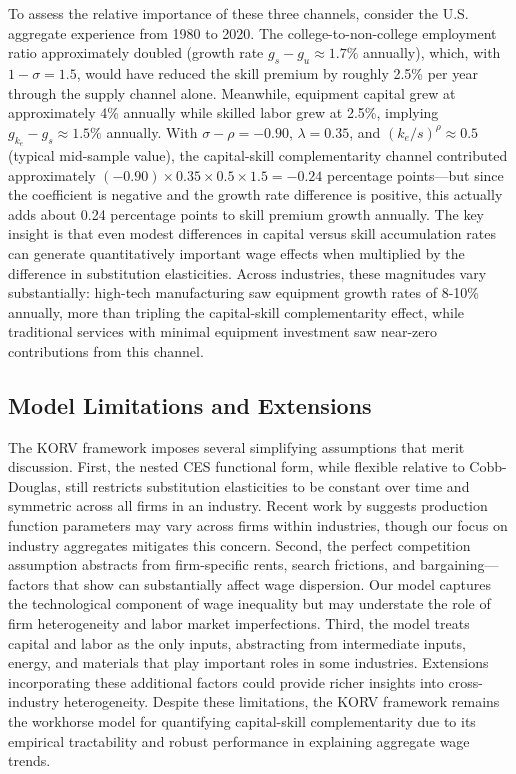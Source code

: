 \documentclass[12pt]{article}
\begin{document}
To assess the relative importance of these three channels, consider the U.S. aggregate experience from 1980 to 2020. The college-to-non-college employment ratio approximately doubled (growth rate $g_s - g_u \approx 1.7\%$ annually), which, with $1-\sigma = 1.5$, would have reduced the skill premium by roughly 2.5\% per year through the supply channel alone. Meanwhile, equipment capital grew at approximately 4\% annually while skilled labor grew at 2.5\%, implying $g_{k_e} - g_s \approx 1.5\%$ annually. With $\sigma - \rho = -0.90$, $\lambda = 0.35$, and $(k_e/s)^\rho \approx 0.5$ (typical mid-sample value), the capital-skill complementarity channel contributed approximately $(-0.90) \times 0.35 \times 0.5 \times 1.5 = -0.24$ percentage points---but since the coefficient is negative and the growth rate difference is positive, this actually adds about 0.24 percentage points to skill premium growth annually. The key insight is that even modest differences in capital versus skill accumulation rates can generate quantitatively important wage effects when multiplied by the difference in substitution elasticities. Across industries, these magnitudes vary substantially: high-tech manufacturing saw equipment growth rates of 8-10\% annually, more than tripling the capital-skill complementarity effect, while traditional services with minimal equipment investment saw near-zero contributions from this channel.

\subsection*{Model Limitations and Extensions}

The KORV framework imposes several simplifying assumptions that merit discussion. First, the nested CES functional form, while flexible relative to Cobb-Douglas, still restricts substitution elasticities to be constant over time and symmetric across all firms in an industry. Recent work by \citet{oberfield2021micro} suggests production function parameters may vary across firms within industries, though our focus on industry aggregates mitigates this concern. Second, the perfect competition assumption abstracts from firm-specific rents, search frictions, and bargaining---factors that \citet{card2018firms} show can substantially affect wage dispersion. Our model captures the technological component of wage inequality but may understate the role of firm heterogeneity and labor market imperfections. Third, the model treats capital and labor as the only inputs, abstracting from intermediate inputs, energy, and materials that play important roles in some industries. Extensions incorporating these additional factors \citep{baqaee2019productivity} could provide richer insights into cross-industry heterogeneity. Despite these limitations, the KORV framework remains the workhorse model for quantifying capital-skill complementarity due to its empirical tractability and robust performance in explaining aggregate wage trends.
\end{document}
